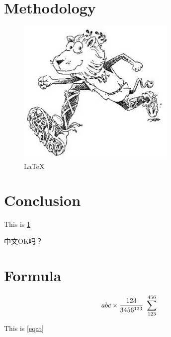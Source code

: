 \lipsum[1]

\section{Methodology}


\begin{figure}[ht]
    \centering
    \includegraphics[width = 3in]{icon.png}
    \caption{\LaTeX}
    \label{icon}
\end{figure}

\section{Conclusion}

This is \ref{icon}

中文OK吗？

\section{Formula}

\begin{equation}\label{eqat}
    abc \times \frac{123}{3456^{123}}
    \\\
    \sum_{123}^{456}
\end{equation}

This is \ref{eqat}








